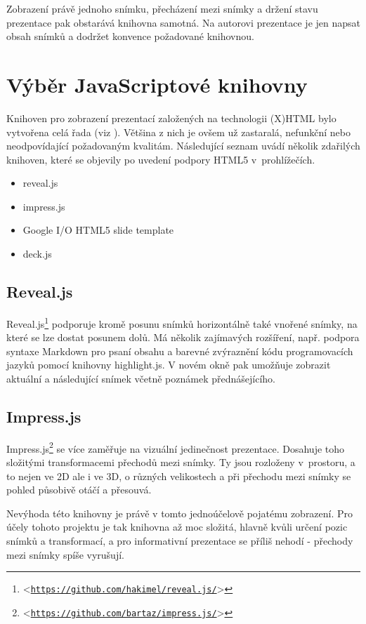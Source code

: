 \documentclass[11pt,twoside,a4paper]{book}
\let\oldUrl\url									%
\renewcommand\url[1]{<\texttt{\oldUrl{#1}}>}
\begin{document}
Zobrazení právě jednoho snímku, přecházení mezi snímky a držení stavu prezentace pak obstarává knihovna samotná. Na autorovi prezentace je jen napsat obsah snímků a dodržet konvence požadované knihovnou.


\section{Výběr JavaScriptové knihovny}
Knihoven pro zobrazení prezentací založených na technologii (X)HTML bylo vytvořena celá řada (viz \cite{htmlslideshowweb}). Většina z nich je ovšem už zastaralá, nefunkční nebo neodpovídající požadovaným kvalitám. Následující seznam uvádí několik zdařilých knihoven, které se objevily po uvedení podpory HTML5 v~prohlížečích.

\begin{itemize}
	\item reveal.js
	\item impress.js
	\item Google I/O HTML5 slide template
	\item deck.js
\end{itemize}


\subsection{Reveal.js} \label{chap:revealjs}
Reveal.js\footnote{\url{https://github.com/hakimel/reveal.js/}} podporuje kromě posunu snímků horizontálně také vnořené snímky, na které se lze dostat posunem dolů. Má několik zajímavých rozšíření, např. podpora syntaxe Markdown pro psaní obsahu a barevné zvýraznění kódu programovacích jazyků pomocí knihovny highlight.js. V novém okně pak umožňuje zobrazit aktuální a následující snímek včetně poznámek přednášejícího.

\subsection{Impress.js}
Impress.js\footnote{\url{https://github.com/bartaz/impress.js/}} se více zaměřuje na vizuální jedinečnost prezentace. Dosahuje toho složitými transformacemi přechodů mezi snímky. Ty jsou rozloženy v~prostoru, a to nejen ve 2D ale i ve 3D, o různých velikostech a při přechodu mezi snímky se pohled působivě otáčí a přesouvá.

Nevýhoda této knihovny je právě v tomto jednoúčelově pojatému zobrazení. Pro účely tohoto projektu je tak knihovna až moc složitá, hlavně kvůli určení pozic snímků a transformací, a pro informativní prezentace se příliš nehodí - přechody mezi snímky spíše vyrušují.
\end{document}
